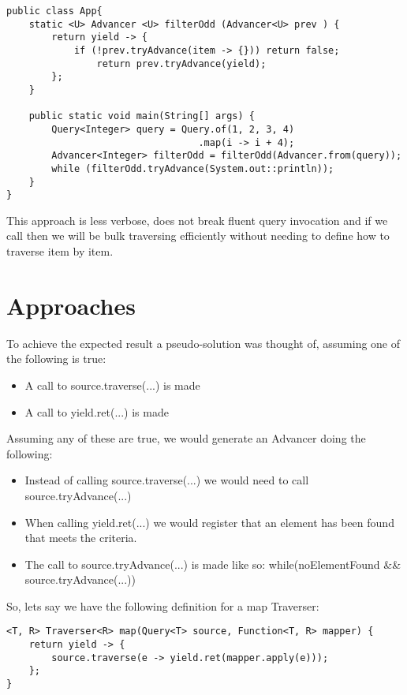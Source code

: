 \begin{lstlisting}[caption={filterOdd using Advancer},captionpos=b]
public class App{
	static <U> Advancer <U> filterOdd (Advancer<U> prev ) {
		return yield -> {
			if (!prev.tryAdvance(item -> {})) return false;
				return prev.tryAdvance(yield);
		};
	}

	public static void main(String[] args) {
        Query<Integer> query = Query.of(1, 2, 3, 4)
                                  .map(i -> i + 4);
        Advancer<Integer> filterOdd = filterOdd(Advancer.from(query));
        while (filterOdd.tryAdvance(System.out::println));
	}
}
\end{lstlisting}

This approach is less verbose, does not break fluent query invocation and if we call then we will be bulk traversing efficiently without needing to define how to traverse item by item.


\section{Approaches}
To achieve the expected result a pseudo-solution was thought of, assuming one of the following is true:
\begin{itemize}
\item A call to source.traverse(...) is made
\item A call to yield.ret(...) is made
\end{itemize}


Assuming any of these are true, we would generate an Advancer doing the following:
\begin{itemize}
\item Instead of calling source.traverse(...) we would need to call source.tryAdvance(...)
\item When calling yield.ret(...) we would register that an element has been found that meets the criteria.
\item The call to source.tryAdvance(...) is made like so: while(noElementFound \&\& source.tryAdvance(...))
\end{itemize}

So, lets say we have the following definition for a map Traverser:
\begin{lstlisting}[caption={Map Traverser},label={lst:map-traverser},captionpos=b]
<T, R> Traverser<R> map(Query<T> source, Function<T, R> mapper) {
	return yield -> {
    	source.traverse(e -> yield.ret(mapper.apply(e)));
	};
}
\end{lstlisting}

